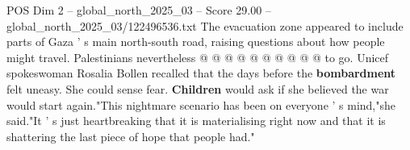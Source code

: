 \begin{textsample}{POS Dim 2 – global\_north\_2025\_03 – Score 29.00 – global\_north\_2025\_03/122496536.txt}
The evacuation zone appeared to include parts of Gaza ' s main north-south road, raising questions about how people might travel.
Palestinians nevertheless @ @ @ @ @ @ @ @ @ @ to go.
Unicef spokeswoman Rosalia Bollen recalled that the days before the \textbf{bombardment} felt uneasy.
She could sense fear. \textbf{Children} would ask if she believed the war would start again."This nightmare scenario has been on everyone ' s mind,"she said."It ' s just heartbreaking that it is materialising right now and that it is shattering the last piece of hope that people had."

\end{textsample}
